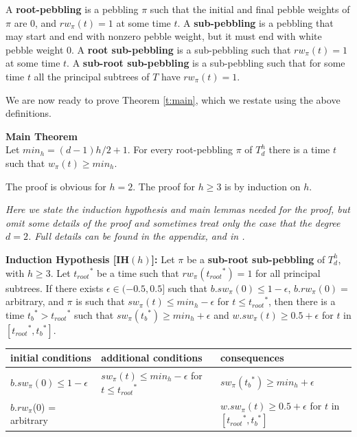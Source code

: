 \documentclass[oribib1]{llncs}
\newcommand{\troots}{{t_{root}}^*}
\newcommand{\tbs}{{t_b}^{*}}
\begin{document}
\begin{definition}
\noindent
A {\bf root-pebbling} is a pebbling $\pi$ such that the initial
and final pebble weights of $\pi$ are 0, and $rw_\pi(t)=1$ at some time
$t$.
A {\bf sub-pebbling} is a pebbling that may start and end with nonzero
pebble weight, but it must end with white pebble weight 0.
A {\bf root sub-pebbling} is a sub-pebbling such that $rw_\pi(t)=1$ at
some time $t$.
A {\bf sub-root sub-pebbling} is a sub-pebbling such that for some time
$t$ all the principal subtrees of $T$ have $rw_\pi(t)=1$.
\end{definition}

We are now ready to prove Theorem \ref{t:main}, which we restate using
the above definitions.

\medskip

\noindent
{\bf Main Theorem} \\Let $min_h = (d-1)h/2+1$.
For every root-pebbling $\pi$ of $T^h_d$ there is a time $t$ such
that $w_\pi(t) \ge min_h$.

\medskip

\noindent
The proof is obvious for $h=2$.  The proof for $h\ge 3$ is by
induction on $h$.

\medskip
{\em Here we state the induction hypothesis and main lemmas needed
for the proof, but omit some details of the proof and sometimes
treat only the case that the degree $d = 2$.
Full details can be found in the appendix, and in \cite{v:frankthesis}.}


\noindent
{\bf Induction Hypothesis [IH$(h)$]:} Let $\pi$ be a {\bf sub-root
sub-pebbling} of $T^h_d$, with $h\ge 3$.   Let $\troots$ be a time such
that $rw_\pi(\troots)=1$ for all principal subtrees.
If there exists $\epsilon \in (-0.5,0.5]$ such that
$b.sw_{\pi}(0) \leq 1-\epsilon$, $b.rw_{\pi}(0) =$ arbitrary,
and $\pi$ is such that $sw_\pi(t) \leq min_h-\epsilon$ for $t \leq \troots$, then there is a time $\tbs > \troots$ such that $sw_\pi(\tbs) \geq min_h+\epsilon$ and $w.sw_\pi(t) \geq 0.5+\epsilon$ for $t$ in $[\troots, \tbs]$.

\medskip

\begin{tabular} { |l|l|l|}\hline
initial conditions & additional conditions & consequences\\\hline
$b.sw_{\pi}(0) \leq 1-\epsilon$ & $sw_\pi(t) \leq min_h-\epsilon$ for $t \leq \troots$ & $sw_\pi(\tbs) \geq min_h+\epsilon$\\\hline
$b.rw_{\pi}$(0) = arbitrary & & $w.sw_\pi(t) \geq 0.5+\epsilon$ for $t$ in $[\troots, \tbs]$\\\hline
\end{tabular}\\
\end{document}
